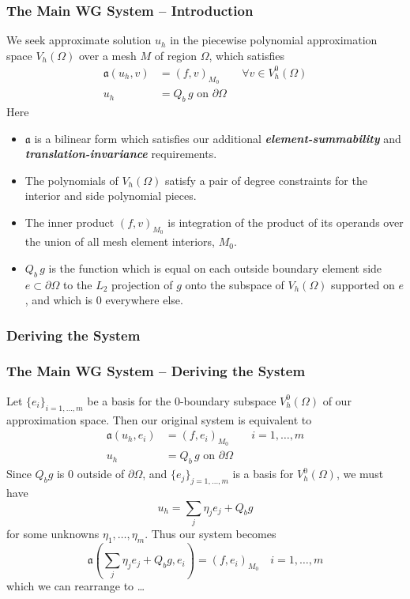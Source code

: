 \documentclass[compress]{beamer}
\begin{document}
\begin{frame}
  \frametitle{The Main WG System -- Introduction}
    We seek approximate solution $u_h$ in the piecewise polynomial approximation space $V_h(\Omega)$ over a mesh $M$ 
    of region $\Omega$, which satisfies
    \begin{align*}
      \mathfrak{a}(u_h,v) & = (f,v)_{M_0}\quad\quad \forall{v} \in V_h^0(\Omega) \\
      u_h & = Q_b\,g \text{ on } \partial\Omega
    \end{align*}
    Here 
    \begin{itemize}[<+->]
      \item $\mathfrak{a}$ is a bilinear form which satisfies our additional \emph{\textbf{element-summability}} 
        and \emph{\textbf{translation-invariance}} requirements.
      \item The polynomials of $V_h(\Omega)$ satisfy a pair of degree constraints for the interior and side polynomial pieces. 
      \item The inner product $(f,v)_{M_0}$ is integration of the product of its operands over the union of all mesh element
        interiors, $M_0$.
      \item $Q_b\,g$ is the function which is equal on each outside boundary element side $e \subset \partial\Omega$ to the 
        $L_2$ projection of $g$ onto the subspace of $V_h(\Omega)$ supported on $e$, and which is $0$ everywhere else.
    \end{itemize}
\end{frame}
    
\subsubsection{Deriving the System}

\begin{frame}
  \frametitle{The Main WG System -- Deriving the System}
  Let $\{e_i\}_{i=1,\dots,m}$ be a basis for the 0-boundary subspace $V_h^0(\Omega)$ of our approximation space.
  Then our original system is equivalent to
  \begin{align*}
    \mathfrak{a}(u_h,e_i) & = (f,e_i)_{M_0}\quad\quad i=1,\dots,m \\
    u_h & = Q_b\,g \text{ on } \partial\Omega
  \end{align*}
  \pause
  Since $Q_b g$ is $0$ outside of $\partial \Omega$, and $\{e_j\}_{j=1,\dots,m}$ is a basis for $V_h^0(\Omega)$, we must have
  $$u_h = \sum_j{\eta_j e_j} + Q_b g$$
  for some unknowns $\eta_1,\dots,\eta_m.$  
  \pause
  Thus our system becomes
  $$\mathfrak{a}(\sum_j{\eta_j e_j} + Q_b g, e_i) = (f, e_i)_{M_0} \quad i=1,\dots,m$$
  which we can rearrange to \dots
\end{frame}
\end{document}
